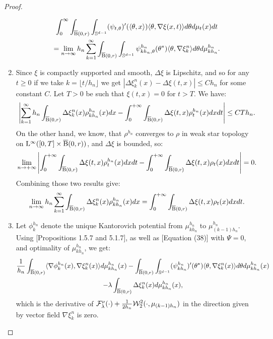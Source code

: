 \begin{proof}
\begin{enumerate}[wide, labelwidth=!, labelindent=0pt,label=(\arabic*)]
\begin{multline} \label{thm:cont_proof_part2}
\int_0^{\infty} \int_{\operatorname{\overline{B}}(0,r)} \int_{\mathbb{S}^{d-1}} (\psi_{t, \theta})' (\langle \theta, x \rangle ) \langle \theta , \nabla \xi (x, t) \rangle d\theta d\mu_t(x) dt \\
= \lim_{n \rightarrow \infty} h_n \sum_{k=1}^{\infty} \int_{\operatorname{\overline{B}}(0,r)} \int_{\mathbb{S}^{d-1}} \psi_{kh_n, \theta}^{h_n} (\theta^{*}) \langle \theta, \nabla \xi_{k}^n \rangle d \theta d\mu_{kh_n}^{h_n}.
\end{multline}
\item  Since $\xi$ is compactly supported and smooth, $\Delta \xi$ is Lipschitz, and so for any $ t \geq 0$ if we take $k = \lfloor t/h_n \rfloor$ we get $| \Delta \xi_k^n(x) - \Delta \xi(t,x) | \leq C h_n$ for some constant $C$. Let $T > 0$ be such that $\xi(t,x) = 0 $ for $t > T$. We have:
\[
\left| \sum_{k=1}^{\infty} h_n \int_{\operatorname{\overline{B}}(0,r)} \Delta \xi_k^n(x) \rho_{kh_n}^{h_n}(x) dx - \int_{0}^{+\infty} \int_{\operatorname{\overline{B}}(0,r)} \Delta \xi(t,x) \rho_{t}^{h_n}(x) dx dt \right| \leq CTh_n .
\]
On the other hand,  we know, that $\rho^{h_n}$ converges to $\rho$ in weak star topology on $\mathrm{L}^{\infty}([0,T] \times \operatorname{\overline{B}}(0,r))$, and $\Delta \xi$ is bounded, so:
\[
\lim_{n \to +\infty}\left| \int_{0}^{+\infty} \int_{\operatorname{\overline{B}}(0,r)} \Delta \xi(t,x) \rho_{t}^{h_n}(x) dx dt - \int_{0}^{+\infty} \int_{\operatorname{\overline{B}}(0,r)} \Delta \xi (t,x) \rho_t(x) dx dt \right|= 0.
\]
Combining those two results give:
\begin{equation} \label{thm:cont_proof_part3}
\lim_{n \rightarrow \infty} h_n \sum_{k=1}^{\infty} \int_{\operatorname{\overline{B}}(0,r)} \Delta \xi_k^n(x) \rho_{kh_n}^{h_n}(x) dx = \int_{0}^{+\infty} \int_{\operatorname{\overline{B}}(0,r)} \Delta \xi (t,x) \rho_t(x) dx dt.
\end{equation}

\item 
  Let $\phi_{k}^{h_n}$ denote the unique Kantorovich potential from $\mu_{kh_n}^{h_n}$ to $\mu_{(k-1)h_n}^{h_n}$. Using  \cite{bonnotte2013unidimensional}[Propositions 1.5.7 and 5.1.7], as well as \cite{jordan1998variational}[Equation (38)] with $\Psi = 0$, and optimality of $\mu_{kh_n}^{h_n}$, we get:
\begin{multline} \label{thm:cont_proof_eq0}
\frac{1}{h_n} \int_{\operatorname{\overline{B}}(0,r)} \langle \nabla \phi_k^{h_n}(x) , \nabla \xi_{k}^n(x) \rangle d\mu_{kh_n}^{h_n}(x)   - \int_{\operatorname{\overline{B}}(0,r)} \int_{\mathbb{S}^{d-1}} (\psi_{kh_n}^{h_n})'(\theta^{*}) \langle \theta, \nabla \xi_k^n(x) \rangle d\theta d\mu_{kh_n}^{h_n}(x)\\ - \lambda \int_{\operatorname{\overline{B}}(0,r)}   \Delta \xi_k^n(x) d\mu_{kh_n}^{h_n}(x) ,
\end{multline}
which is the derivative of $\mathcal{F}^{\nu}_{\lambda}(\cdot) + \frac{1}{2h_n}{\cal W}_2^2(\cdot, \mu_{(k-1)h_n})$ in the direction given by vector field $\nabla \xi_k^n$ is zero.


\end{enumerate}
\end{proof}
